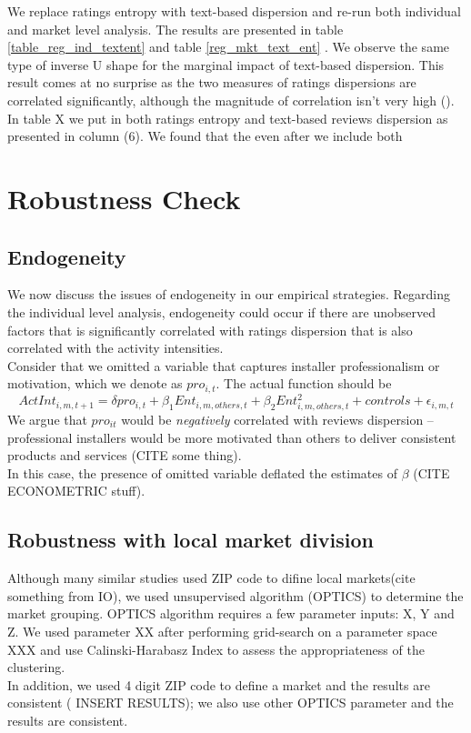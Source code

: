 \documentclass[msom,blindrev]{informs3}
\begin{document}
We replace ratings entropy with text-based dispersion and re-run both individual and market level analysis. The results are presented in table \ref{table_reg_ind_textent} and table \ref{reg_mkt_text_ent} . We observe the same type of inverse U shape for the marginal impact of text-based dispersion. This result comes at no surprise as the two measures of ratings dispersions are correlated significantly, although the magnitude of correlation isn't very high (). In table X we put in both ratings entropy and text-based reviews dispersion as presented in column (6). We found that the even after we include both  \\



\section{Robustness Check}
\subsection{Endogeneity}
We now discuss the issues of endogeneity in our empirical strategies. Regarding the individual level analysis, endogeneity could occur if there are unobserved factors that is significantly correlated with ratings dispersion that is also correlated with the activity intensities.\\
Consider that we omitted a variable that captures installer professionalism or motivation, which we denote as $pro_{i,t}$. The actual function should be
\begin{equation}
ActInt_{i,m,t+1}=\delta pro_{i,t}+\beta_{1} Ent_{i,m,others,t}+\beta_{2}Ent_{i,m,others,t}^2+controls+\epsilon_{i,m,t}
\end{equation}
We argue that $pro_{it}$ would be \textit{negatively} correlated with reviews dispersion -- professional installers would be more motivated than others to deliver consistent products and services (CITE some thing).  \\

In this case, the presence of omitted variable deflated the estimates of $\beta$ (CITE ECONOMETRIC stuff). \\


\subsection{Robustness with local market division}
Although many similar studies used ZIP code to difine local markets(cite something from IO), we used unsupervised algorithm (OPTICS) to determine the market grouping. OPTICS algorithm requires a few parameter inputs: X, Y and Z. We used parameter XX after performing grid-search on a parameter space XXX and use Calinski-Harabasz Index to assess the appropriateness of the clustering.  \\ In addition, we used 4 digit ZIP code to define a market and the results are consistent ( INSERT RESULTS); we also use other OPTICS parameter and the results are consistent.  \\
\end{document}
